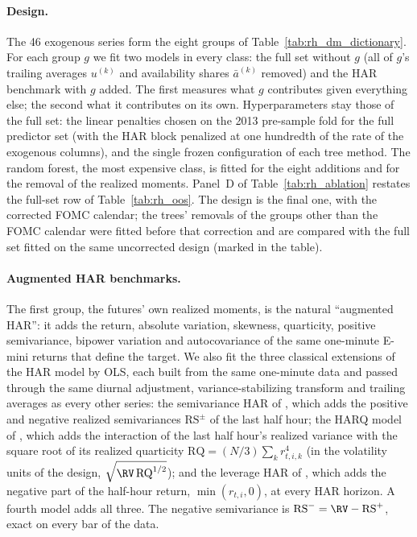 \paragraph{Design.}  The 46 exogenous series form the eight groups of Table~\ref{tab:rh_dm_dictionary}.  For each group
$g$ we fit two models in every class: the full set without $g$ (all of $g$'s trailing averages $u^{(k)}$ and
availability shares $\bar a^{(k)}$ removed) and the HAR benchmark with $g$ added.  The first measures what $g$
contributes given everything else; the second what it contributes on its own.  Hyperparameters stay those of the full
set: the linear penalties chosen on the 2013 pre-sample fold for the full predictor set (with the HAR block
penalized at one hundredth of the rate of the exogenous columns), and the single frozen configuration of each tree
method.  The random forest, the most expensive class, is fitted for the eight additions and for the removal of the
realized moments.  Panel~D of Table~\ref{tab:rh_ablation} restates the full-set row of Table~\ref{tab:rh_oos}.  The
design is the final one, with the corrected FOMC calendar; the trees' removals of the groups other than the FOMC
calendar were fitted before that correction and are compared with the full set fitted on the same uncorrected design
(marked in the table).

\paragraph{Augmented HAR benchmarks.}  The first group, the futures' own realized moments, is the natural
``augmented HAR'': it adds the return, absolute variation, skewness, quarticity, positive semivariance, bipower
variation and autocovariance of the same one-minute E-mini returns that define the target.  We also fit the three
classical extensions of the HAR model by OLS, each built from the same one-minute data and passed through the same
diurnal adjustment, variance-stabilizing transform and trailing averages as every other series: the semivariance HAR
of \citet{PattonSheppard2015}, which adds the positive and negative realized semivariances $\mathrm{RS}^{\pm}$ of the
last half hour; the HARQ model of \citet{BollerslevPattonQuaedvlieg2016}, which adds the interaction of the last
half hour's realized variance with the square root of its realized quarticity $\mathrm{RQ} = (N/3)\sum_k r^4_{t,i,k}$
(in the volatility units of the design, $\sqrt{\RV\,\mathrm{RQ}^{1/2}}$); and the leverage HAR of
\citet{CorsiReno2012}, which adds the negative part of the half-hour return, $\min(r_{t,i}, 0)$, at every HAR horizon.
A fourth model adds all three.  The negative semivariance is $\mathrm{RS}^{-} = \RV - \mathrm{RS}^{+}$, exact on every
bar of the data.

